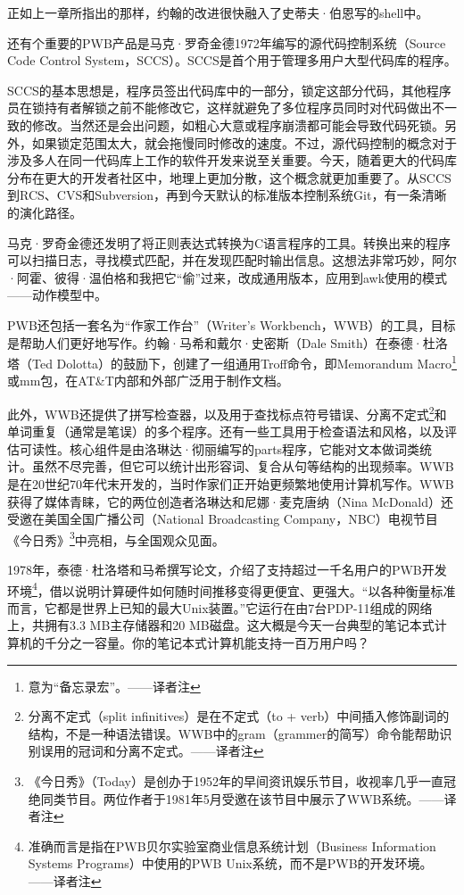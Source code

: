 \documentclass[a4paper,12pt,UTF8,twoside]{ctexbook}
\begin{document}
正如上一章所指出的那样，约翰的改进很快融入了史蒂夫·伯恩写的shell中。

还有个重要的PWB产品是马克·罗奇金德1972年编写的源代码控制系统（Source Code Control System，SCCS）。SCCS是首个用于管理多用户大型代码库的程序。

SCCS的基本思想是，程序员签出代码库中的一部分，锁定这部分代码，其他程序员在锁持有者解锁之前不能修改它，这样就避免了多位程序员同时对代码做出不一致的修改。当然还是会出问题，如粗心大意或程序崩溃都可能会导致代码死锁。另外，如果锁定范围太大，就会拖慢同时修改的速度。不过，源代码控制的概念对于涉及多人在同一代码库上工作的软件开发来说至关重要。今天，随着更大的代码库分布在更大的开发者社区中，地理上更加分散，这个概念就更加重要了。从SCCS到RCS、CVS和Subversion，再到今天默认的标准版本控制系统Git，有一条清晰的演化路径。

马克·罗奇金德还发明了将正则表达式转换为C语言程序的工具。转换出来的程序可以扫描日志，寻找模式匹配，并在发现匹配时输出信息。这想法非常巧妙，阿尔·阿霍、彼得·温伯格和我把它“偷”过来，改成通用版本，应用到awk使用的模式——动作模型中。

PWB还包括一套名为“作家工作台”（Writer’s Workbench，WWB）的工具，目标是帮助人们更好地写作。约翰·马希和戴尔·史密斯（Dale Smith）在泰德·杜洛塔（Ted Dolotta）的鼓励下，创建了一组通用Troff命令，即Memorandum Macro\footnote{意为“备忘录宏”。——译者注}或mm包，在AT\&T内部和外部广泛用于制作文档。

此外，WWB还提供了拼写检查器，以及用于查找标点符号错误、分离不定式\footnote{分离不定式（split infinitives）是在不定式（to + verb）中间插入修饰副词的结构，不是一种语法错误。WWB中的gram（grammer的简写）命令能帮助识别误用的冠词和分离不定式。——译者注}和单词重复（通常是笔误）的多个程序。还有一些工具用于检查语法和风格，以及评估可读性。核心组件是由洛琳达·彻丽编写的parts程序，它能对文本做词类统计。虽然不尽完善，但它可以统计出形容词、复合从句等结构的出现频率。WWB是在20世纪70年代末开发的，当时作家们正开始更频繁地使用计算机写作。WWB获得了媒体青睐，它的两位创造者洛琳达和尼娜·麦克唐纳（Nina McDonald）还受邀在美国全国广播公司（National Broadcasting Company，NBC）电视节目《今日秀》\footnote{《今日秀》（Today）是创办于1952年的早间资讯娱乐节目，收视率几乎一直冠绝同类节目。两位作者于1981年5月受邀在该节目中展示了WWB系统。——译者注}中亮相，与全国观众见面。

1978年，泰德·杜洛塔和马希撰写论文，介绍了支持超过一千名用户的PWB开发环境\footnote{准确而言是指在PWB贝尔实验室商业信息系统计划（Business Information Systems Programs）中使用的PWB Unix系统，而不是PWB的开发环境。——译者注}，借以说明计算硬件如何随时间推移变得更便宜、更强大。“以各种衡量标准而言，它都是世界上已知的最大Unix装置。”它运行在由7台PDP-11组成的网络上，共拥有3.3 MB主存储器和20 MB磁盘。这大概是今天一台典型的笔记本式计算机的千分之一容量。你的笔记本式计算机能支持一百万用户吗？
\end{document}
